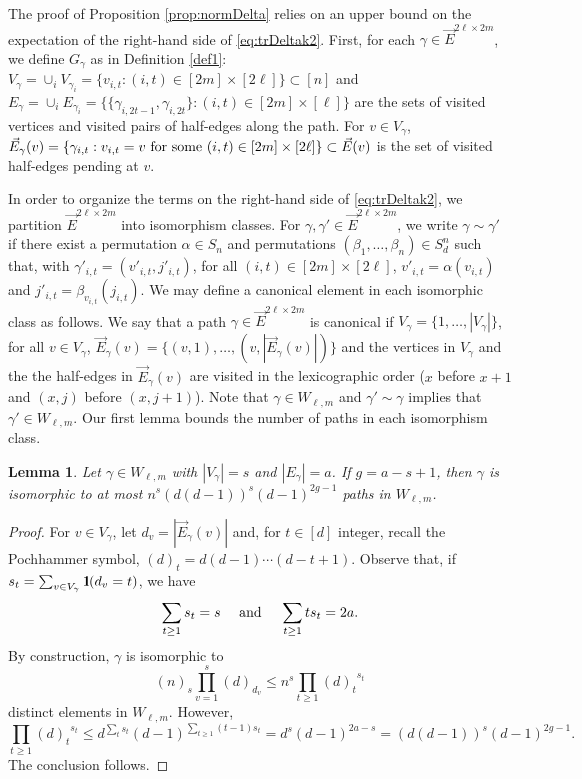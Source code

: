 \documentclass[11pt]{article}
\newtheorem{lemma}{Lemma}
\newcommand{\cE}{E}
\newcommand{\PAR}[1]{{{\left(#1\right)}}} %
\newcommand{\1}{1\!\!{\sf I}}\newcommand{\IND}{\1}
\begin{document}
The proof of Proposition \ref{prop:normDelta} relies on an upper bound on the expectation of the right-hand side of \eqref{eq:trDeltak2}. First, for each $\gamma \in \vec E^{2\ell\times 2m}$, we define $G_\gamma$ as in Definition \ref{def1}: $V_\gamma = \cup_i V_{\gamma_i} = \{ v_{i,t} : (i,t) \in [2m] \times [2\ell] \} \subset [n]$ and $\cE_\gamma = \cup_i \cE_{\gamma_i} = \{ \{ \gamma_{i,2t-1}  , \gamma_{i,2t}  \} :   (i,t) \in [2m] \times [\ell] \}$ are the sets of visited vertices and visited pairs of half-edges along the path.  For $v \in V_\gamma$,  $\vec E_\gamma(v) = \{ \gamma_{i,t} : v_{i,t} = v \hbox{ for some $(i,t) \in [2m] \times [2\ell]$} \}\subset \vec E(v)$ is the set of visited half-edges pending at $v$. 


In order to organize the terms on the right-hand side of \eqref{eq:trDeltak2}, we partition  $\vec E^{2\ell \times 2m}$ into isomorphism classes. For $\gamma,\gamma'\in \vec E^{2\ell \times 2m}$, we write $\gamma \sim \gamma'$ if there exist a permutation $\alpha \in S_n$ and permutations $(\beta_1, \ldots, \beta_{n} ) \in S_{d}^n$ such that, with $\gamma'_{i,t}  = (v'_{i,t} , j'_{i,t})$, for all $(i,t) \in [2m] \times [2\ell]$, $v'_{i,t} = \alpha ( v_{i,t})$ and $j'_{i,t}  = \beta_{v_{i,t}} ( j_{i,t})$.  We may define a canonical element in each isomorphic class as follows. We say that a path $\gamma \in \vec E^{2\ell \times 2m}$ is canonical if $V_\gamma = \{ 1, \ldots, |V_\gamma| \}$, for all $v \in V_\gamma$, $\vec E_\gamma(v) = \{ (v,1), \ldots, (v,|\vec E_\gamma(v)|)\}$  and the vertices in $V_\gamma$ and the the half-edges in $\vec E_\gamma(v)$  are visited in the lexicographic order ($x$ before $x+1$ and $(x,j)$ before $(x,j+1)$).  Note that $\gamma \in W_{\ell,m}$ and $\gamma'\sim \gamma$ implies that $\gamma'\in W_{\ell,m}$. Our first lemma bounds the number of paths in each isomorphism class.
\begin{lemma}\label{le:isopath}
Let $\gamma \in W_{\ell,m}$ with $|V_\gamma| = s $ and $|\cE_\gamma| = a$. If $g = a - s +1$, then $\gamma$  is isomorphic to at most 
$
  n^s \PAR{ d (d-1) }^{ s} (d-1)^{2g -1} 
$ 
paths in $W_{\ell,m}$.  
\end{lemma}

\begin{proof}
For $v \in V_\gamma$, let $d_v = |\vec E_\gamma(v)|$ and, for $t \in [d]$ integer, recall the Pochhammer symbol, $(d)_t = d (d-1) \cdots (d-t+1)$.  Observe that, if $s_t = \sum_{v\in V_\gamma} \IND ( d_v = t)$,  we have 
$$
\sum_{t \geq 1} s_t = s \quad \hbox{ and } \quad \sum_{t \geq 1} t s_t = 2 a.
$$
By construction, $\gamma$ is isomorphic to 
$$
(n)_s \prod_{v =1}^s (d)_{d_v}\leq n^s \prod_{t \geq 1} {(d)_t }^{s_t}
$$
distinct elements in $W_{\ell,m}$. However,
$$
\prod_{t \geq 1} {(d)_t }^{s_t} \leq d^{\sum_{t} s_t } (d-1) ^{\sum_{t\geq1} (t-1) s_t}  = d^s (d-1)^{2 a - s} = \PAR{d (d-1) }^s \PAR{d-1 }^{2 g -1}. 
$$
The conclusion follows.
\end{proof}
\end{document}
